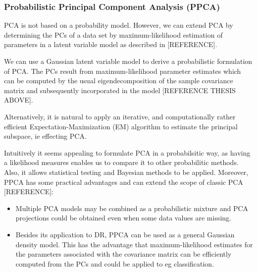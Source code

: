 \hfill
\subsubsection{Probabilistic Principal Component Analysis (PPCA)}

PCA is not based on a probability model. However, we can extend PCA by determining the PCs of a data set by maximum-likelihood estimation of parameters in a latent variable model as described in [REFERENCE].

We can use a Gaussian latent variable model %
to derive a probabilistic formulation of PCA. The PCs result from maximum-likelihood parameter estimates which can be computed by the usual eigendecomposition of the sample covariance matrix and subsequently incorporated in the model [REFERENCE THESIS ABOVE]. 

Alternatively, it is natural to apply an iterative, and computationally rather efficient Expectation-Maximization (EM) algorithm to estimate the principal subspace, ie effecting PCA.


Intuitively it seems appealing to formulate PCA in a probabilsitic way, as having a likelihood measures enables us to compare it to other probabilitic methods. Also, it allows statistical testing and Bayesian methods to be applied. 
Moreover, PPCA has some practical advantages and can extend the scope of classic PCA [REFERENCE]:
\begin{itemize}
	\item  Multiple PCA models may be combined as a probabilistic mixture and PCA projections could be obtained even when some data values are missing.
	\item Besides its application to DR, PPCA can be used as a general Gaussian density model. This has the advantage that maximum-likelihood estimates for the parameters associated with the covariance matrix can be efficiently computed from the PCs and could be applied to eg classification. 
\end{itemize}


